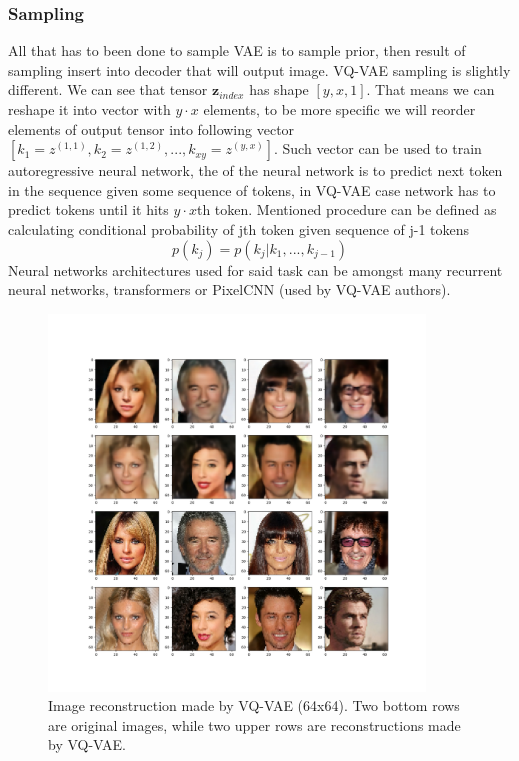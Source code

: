 \documentclass[10pt]{article}
\begin{document}
\subsubsection{Sampling}
All that has to been done to sample VAE is to sample prior, then result of sampling insert into decoder that will output image. VQ-VAE sampling is slightly different. We can see that  tensor $\textbf{z}_{index}$
has shape $[y, x, 1]$. That means we can reshape it into vector with  $y\cdot x $ elements, to be more specific we will reorder elements of output tensor into following vector $[k_1 = z^{(1,1)},k_2 = z^{(1,2)}, ... , k_{xy} = z^{(y,x)}]$. Such vector can be used to train autoregressive neural network, the of the neural network is to predict next token in the sequence given some sequence of tokens, in VQ-VAE case network has to predict tokens until it hits   $y\cdot x $th token. Mentioned procedure can be defined as calculating conditional probability of jth token given sequence of j-1 tokens
\begin{equation}
   p(k_j) =  p(k_j | k_1, ..., k_{j-1} )
\end{equation}
Neural networks architectures used for said task can be amongst many recurrent neural networks, transformers or PixelCNN (used by VQ-VAE authors).
\begin{figure}[H]
    \includegraphics[width=10cm, height = 10cm]{vq_vae_img.png}
    \caption[Image reconstruction made by VQ-VAE (64x64).]
    {Image reconstruction made by VQ-VAE (64x64). Two bottom rows are original images, while two upper rows are reconstructions made by VQ-VAE.}
\end{figure}
\end{document}
